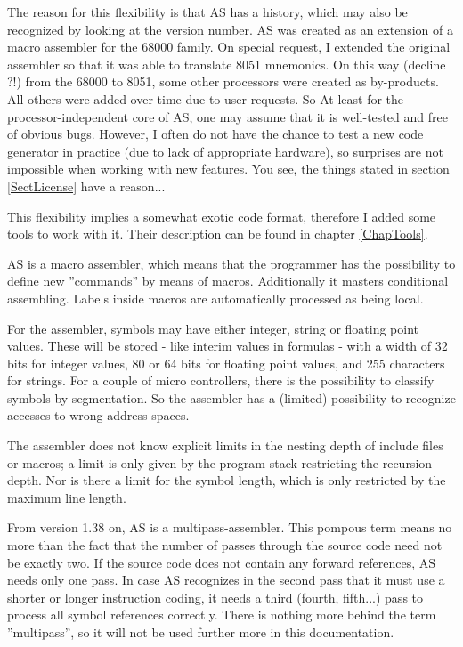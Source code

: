 \documentclass[12pt,twoside]{report}
\newcommand{\asname}{{AS}}
\begin{document}
The reason for this flexibility is that \asname{} has a history, which may also
be recognized by looking at the version number. \asname{} was created as an
extension of a macro assembler for the 68000 family. On special request, I
extended the original assembler so that it was able to translate 8051
mnemonics.  On this way (decline ?!) from the 68000 to 8051, some other
processors were created as by-products.  All others were added over time
due to user requests.  So At least for the processor-independent core of
\asname{}, one may assume that it is well-tested and free of obvious bugs.
However, I often do not have the chance to test a new code generator in
practice (due to lack of appropriate hardware), so surprises are not
impossible when working with new features.  You see, the things stated in
section \ref{SectLicense} have a reason...

This flexibility implies a somewhat exotic code format, therefore I
added some tools to work with it. Their description can be found in
chapter \ref{ChapTools}.

\asname{} is a macro assembler, which means that the programmer has the
possibility to define new ''commands'' by means of macros.
Additionally it masters conditional assembling.  Labels inside macros
are automatically processed as being local.

For the assembler, symbols may have either integer, string or floating
point values.  These will be stored - like interim values in formulas -
with a width of 32 bits for integer values, 80 or 64 bits for floating
point values, and 255 characters for strings.  For a couple of micro
controllers, there is the possibility to classify symbols by segmentation.
So the assembler has a (limited) possibility to recognize accesses to
wrong address spaces.

The assembler does not know explicit limits in the nesting depth of
include files or macros; a limit is only given by the program stack
restricting the recursion depth.  Nor is there a limit for the
symbol length, which is only restricted by the maximum line length.

From version 1.38 on, \asname{} is a multipass-assembler.  This pompous term
means no more than the fact that the number of passes through the
source code need not be exactly two. If the source code does not
contain any forward references, \asname{} needs only one pass.  In case \asname{}
recognizes in the second pass that it must use a shorter or longer
instruction coding, it needs a third (fourth, fifth...) pass to
process all symbol references correctly. There is nothing more behind
the term ''multipass'', so it will not be used further more in this
documentation.
\end{document}
